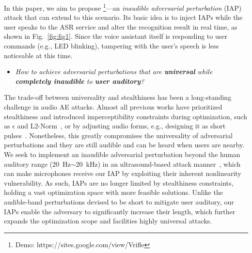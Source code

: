 In this paper, we aim to propose \alias\footnote{Demo: https://sites.google.com/view/Vrifle}---an \textit{inaudible adversarial perturbation} (IAP) attack that can extend to this scenario. Its basic idea is to inject IAPs while the user speaks to the ASR service and alter the recognition result in real time, as shown in Fig.~\ref{fig:fig1}. Since the voice assistant itself is responding to user commands (e.g., LED blinking), tampering with the user's speech is less noticeable at this time. 


\begin{itemize}[leftmargin=*]
\item \textit{How to achieve adversarial perturbations that are \textbf{universal} while \textbf{completely inaudible} to \textbf{user auditory}?}
\end{itemize}

The trade-off between universality and stealthiness has been a long-standing challenge in audio AE attacks. Almost all previous works have prioritized stealthiness and introduced imperceptibility constraints during optimization, such as $\epsilon$ and L2-Norm~\cite{carlini2018audio}, or by adjusting audio forms, e.g., designing it as short pulses~\cite{guo2022specpatch}. Nonetheless, this greatly compromises the universality of adversarial perturbations and they are still audible and can be heard when users are nearby.
We seek to implement an inaudible adversarial perturbation beyond the human auditory range (20~Hz$\sim$20~kHz) in an ultrasound-based attack manner~\cite{zhang2017dolphinattack},
which can make microphones receive our IAP by exploiting their inherent nonlinearity vulnerability. As such, IAPs are no longer limited by stealthiness constraints, holding a vast optimization space with more feasible solutions. 
Unlike the audible-band perturbations devised to be short to mitigate user auditory, our IAPs enable the adversary to significantly increase their length, which further expands the optimization scope and facilities highly universal attacks.



